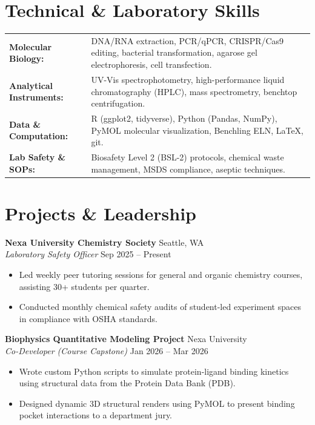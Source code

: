 \documentclass[10pt,letterpaper]{article}
\begin{document}
\section*{Technical \& Laboratory Skills}
\noindent
\begin{tabularx}{\textwidth}{@{}p{1.6in} X@{}}
    \textbf{Molecular Biology:} & DNA/RNA extraction, PCR/qPCR, CRISPR/Cas9 editing, bacterial transformation, agarose gel electrophoresis, cell transfection. \\
    \textbf{Analytical Instruments:} & UV-Vis spectrophotometry, high-performance liquid chromatography (HPLC), mass spectrometry, benchtop centrifugation. \\
    \textbf{Data \& Computation:} & R (ggplot2, tidyverse), Python (Pandas, NumPy), PyMOL molecular visualization, Benchling ELN, \LaTeX, git. \\
    \textbf{Lab Safety \& SOPs:} & Biosafety Level 2 (BSL-2) protocols, chemical waste management, MSDS compliance, aseptic techniques.
\end{tabularx}

\section*{Projects \& Leadership}
\noindent
\textbf{Nexa University Chemistry Society} \hfill Seattle, WA \\
\textit{Laboratory Safety Officer} \hfill Sep 2025 -- Present
\begin{itemize}
    \item Led weekly peer tutoring sessions for general and organic chemistry courses, assisting 30+ students per quarter.
    \item Conducted monthly chemical safety audits of student-led experiment spaces in compliance with OSHA standards.
\end{itemize}

\vspace{8pt}

\noindent
\textbf{Biophysics Quantitative Modeling Project} \hfill Nexa University \\
\textit{Co-Developer (Course Capstone)} \hfill Jan 2026 -- Mar 2026
\begin{itemize}
    \item Wrote custom Python scripts to simulate protein-ligand binding kinetics using structural data from the Protein Data Bank (PDB).
    \item Designed dynamic 3D structural renders using PyMOL to present binding pocket interactions to a department jury.
\end{itemize}
\end{document}
